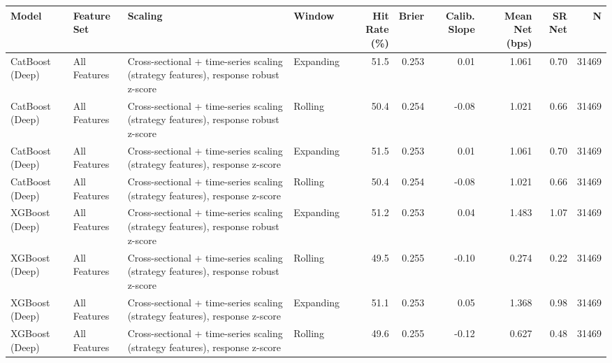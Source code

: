 \begin{tabular}{llllrrrrrr}
\toprule
Model & Feature Set & Scaling & Window & Hit Rate (\%) & Brier & Calib. Slope & Mean Net (bps) & SR Net & N \\
\midrule
CatBoost (Deep) & All Features & Cross-sectional + time-series scaling (strategy features), response robust z-score & Expanding & 51.5 & 0.253 & 0.01 & 1.061 & 0.70 & 31469 \\
CatBoost (Deep) & All Features & Cross-sectional + time-series scaling (strategy features), response robust z-score & Rolling & 50.4 & 0.254 & -0.08 & 1.021 & 0.66 & 31469 \\
CatBoost (Deep) & All Features & Cross-sectional + time-series scaling (strategy features), response z-score & Expanding & 51.5 & 0.253 & 0.01 & 1.061 & 0.70 & 31469 \\
CatBoost (Deep) & All Features & Cross-sectional + time-series scaling (strategy features), response z-score & Rolling & 50.4 & 0.254 & -0.08 & 1.021 & 0.66 & 31469 \\
XGBoost (Deep) & All Features & Cross-sectional + time-series scaling (strategy features), response robust z-score & Expanding & 51.2 & 0.253 & 0.04 & 1.483 & 1.07 & 31469 \\
XGBoost (Deep) & All Features & Cross-sectional + time-series scaling (strategy features), response robust z-score & Rolling & 49.5 & 0.255 & -0.10 & 0.274 & 0.22 & 31469 \\
XGBoost (Deep) & All Features & Cross-sectional + time-series scaling (strategy features), response z-score & Expanding & 51.1 & 0.253 & 0.05 & 1.368 & 0.98 & 31469 \\
XGBoost (Deep) & All Features & Cross-sectional + time-series scaling (strategy features), response z-score & Rolling & 49.6 & 0.255 & -0.12 & 0.627 & 0.48 & 31469 \\
\bottomrule
\end{tabular}
